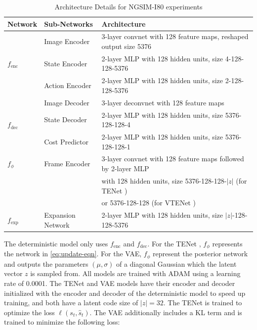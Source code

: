\documentclass{article}
\newcommand{\modelname}{TENet }
\begin{document}
\begin{appendices}
\begin{table}[h]
  \caption{Architecture Details for NGSIM-I80 experiments}
  \label{sample-table}
  \centering
  \begin{tabular}{lll}
    \toprule
    Network & Sub-Networks     & Architecture    \\
    \midrule
    \multirow{3}{*}{$f_\text{enc}$} & Image Encoder & 3-layer convnet with 128 feature maps, reshaped output size 5376 \\
    & State Encoder & 2-layer MLP with 128 hidden units, size 4-128-128-5376 \\
    & Action Encoder & 2-layer MLP with 128 hidden units, size 2-128-128-5376  \\
    \hline
        \multirow{3}{*}{$f_\text{dec}$} & Image Decoder & 3-layer deconvnet with 128 feature maps \\
    & State Decoder & 2-layer MLP with 128 hidden units, size 5376-128-128-4 \\
        & Cost Predictor & 2-layer MLP with 128 hidden units, size 5376-128-128-1 \\
    \hline
    $f_\phi$ & Frame Encoder & 3-layer convnet with 128 feature maps followed by 2-layer MLP \\ & & with 128 hidden units, size 5376-128-128-$|z|$ (for \modelname) \\
    &               & or 5376-128-128 (for V\modelname) \\
    \hline
    $f_\text{exp}$ & Expansion Network & 2-layer MLP with 128 hidden units, size $|z|$-128-128-5376\\
    \hline
    \bottomrule
  \end{tabular}
\end{table}


The deterministic model only uses $f_\text{enc}$ and $f_\text{dec}$.
For the \modelname, $f_\phi$ represents the network in \cref{eq:update-eqn}.
For the VAE, $f_\phi$ represent the posterior network and outputs the parameters $(\mu, \sigma)$ of a diagonal Gaussian which the latent vector $z$ is sampled from.
All models are trained with ADAM \citep{ADAM} using a learning rate of 0.0001.
The \modelname and VAE models have their encoder and decoder initialized with the encoder and decoder of the deterministic model to speed up training, and both have a latent code size of $|z|=32$.
The \modelname is trained to optimize the loss $\ell(s_t, \hat{s}_t)$.
The VAE additionally includes a KL term and is trained to minimize the following loss:


\end{appendices}
\end{document}

